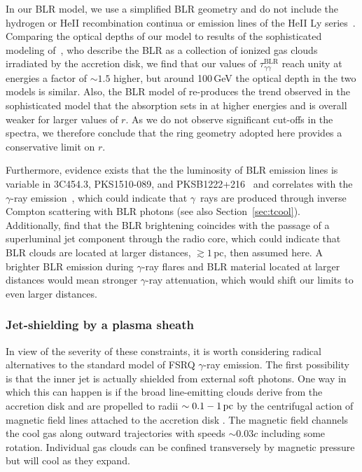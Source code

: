 \documentclass[twocolumn,linenumbers]{aastex62}
\newcommand{\Grays}{$\gamma$~rays\xspace}
\newcommand{\gray}{$\gamma$-ray\xspace}
\begin{document}
In our BLR model, we use a simplified BLR geometry and do not include the hydrogen or HeII recombination continua or emission lines of the HeII Ly series~\citep[as done in, e.g.,][]{2010ApJ...717L.118P,2014ApJ...794....8S}. 
Comparing the optical depths of our model to results of the sophisticated modeling of~\citet[see in particular their Figure~11]{2017MNRAS.464..152A}, who describe the BLR as a collection of ionized gas clouds irradiated by the accretion disk, we find that our values of $\tau_{\gamma\gamma}^\mathrm{BLR}$ reach unity at energies a factor of $\sim1.5$ higher, but around 100\,GeV the optical depth in the two models is similar. 
Also, the BLR model of \citet{finke2016} re-produces the trend observed in the sophisticated model that the absorption sets in at higher energies and is overall weaker for larger values of $r$. 
As we do not observe significant cut-offs in the spectra, we therefore conclude that the ring geometry adopted here provides a conservative limit on $r$. 

Furthermore, evidence exists that the the luminosity of BLR emission lines is variable in 3C454.3, PKS1510-089, and PKSB1222+216~\citep{2013ApJ...763L..36L,2015ApJ...804....7I} and correlates with the \gray emission~\citep{2013ApJ...763L..36L,2015IAUS..313...43L}, which could indicate that \Grays are produced through inverse Compton scattering with BLR photons (see also Section~\ref{sec:tcool}).  
Additionally, \citet{2013ApJ...763L..36L} find that the BLR brightening coincides with the passage of a superluminal jet component through the radio core, which could indicate that BLR clouds are located at larger distances, $\gtrsim 1\,$pc, then assumed here.
A brighter BLR emission during \gray flares and BLR material located at larger distances would mean stronger \gray attenuation, which would shift our limits to even larger distances. 

\subsubsection{Jet-shielding by a plasma sheath}
\label{sec:plasma-sheath}

In view of the severity of these constraints, it is worth considering radical alternatives to the standard model of FSRQ \gray emission. The first possibility is that the inner jet is actually shielded from external soft photons. One way in which this can happen is if the broad line-emitting clouds derive from the accretion disk and are propelled to radii $\sim0.1-1\,{\rm pc}$ by the centrifugal action of magnetic field lines attached to the accretion disk \citep{emmering:1992mac,1994ApJ...434..446K,bottorf:1997dyn}. The magnetic field channels the cool gas along outward trajectories with speeds $\sim0.03c$ including some rotation.  Individual gas clouds can be confined transversely by magnetic pressure but will cool as they expand. 
\end{document}
